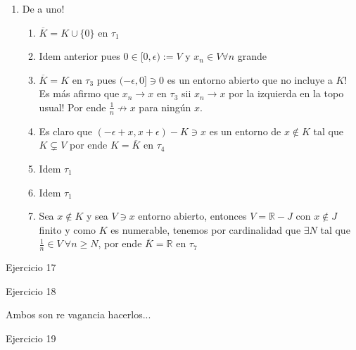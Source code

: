 \documentclass[11pt]{article}
\newcommand{\R}{{\mathbb{R}}}
\newcommand{\sett}[1]{\{#1\}}
\newenvironment{proof}[1][Demostraci\'on]{\begin{trivlist}
\item[\hskip \labelsep {\bfseries #1}]}{\end{trivlist}}
\newcommand{\qed}{\nobreak \ifvmode \relax \else
      \ifdim\lastskip<1.5em \hskip-\lastskip
      \hskip1.5em plus0em minus0.5em \fi \nobreak
      \vrule height0.75em width0.5em depth0.25em\fi}
\begin{document}
\begin{enumerate}
\begin{proof}
\begin{enumerate}
\item De a uno!

\begin{enumerate}

\item $\overline{K} = K \cup \sett{0}$ en $\tau_1$

\item Idem anterior pues $0 \in [0,\epsilon):=V$ y $x_n \in V \forall n$ grande

\item $\overline{K} = K$ en $\tau_3$ pues $(-\epsilon,0] \ni 0$ es un entorno abierto que no incluye a $K$! Es m\'as afirmo que $x_n \rightarrow x$ en $\tau_3$ sii $x_n \rightarrow x$ por la izquierda en la topo usual! Por ende $\frac{1}{n} \not \rightarrow x$ para ning\'un $x$.

\item Es claro que $(- \epsilon + x ,x + \epsilon) - K \ni x$ es un entorno de $x \not \in K$ tal que $K \subsetneq V$ por ende $K = \overline{K}$ en $\tau_4$

\item Idem $\tau_1$

\item Idem $\tau_1$

\item Sea $x \not \in K$ y sea $V \ni x$ entorno abierto, entonces $V = \R - J$ con $x \not \in J$ finito
 y como $K$ es numerable, tenemos por cardinalidad que $\exists N$ tal que $\frac{1}{n} \in V \ \forall n \geq N$, por ende $\overline{K}=\R$ en $\tau_7$ \qed
\end{enumerate}

\end{enumerate}
\end{proof}

\item {Ejercicio 17}

\item{Ejercicio 18}

\begin{proof}
Ambos son re vagancia hacerlos...
\end{proof}

\item {Ejercicio 19}


\end{enumerate}
\end{document}
